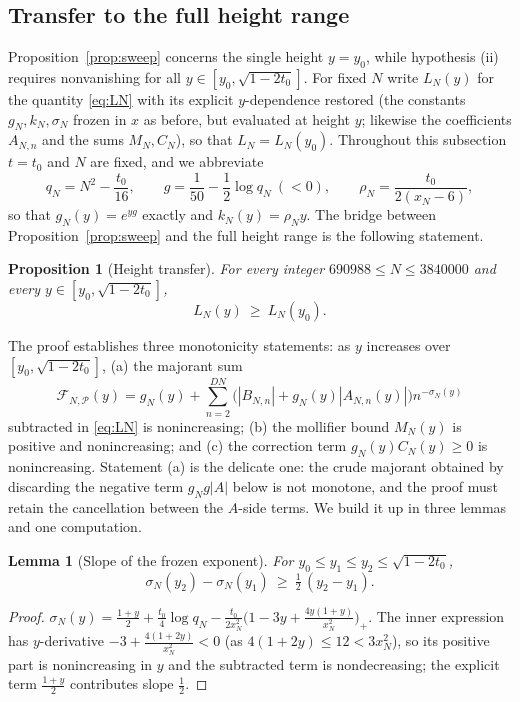 \documentclass[11pt]{article}
\newtheorem{lemma}[theorem]{Lemma}
\newtheorem{proposition}[theorem]{Proposition}
\theoremstyle{definition}
\newcommand{\calP}{\mathcal{P}}
\begin{document}
\subsection{Transfer to the full height range}\label{sec:dini}

Proposition~\ref{prop:sweep} concerns the single height $y=y_0$,
while hypothesis (ii) requires nonvanishing for all
$y\in[y_0,\sqrt{1-2t_0}]$. For fixed $N$ write $L_N(y)$ for the
quantity \eqref{eq:LN} with its explicit $y$-dependence restored
(the constants $g_N,k_N,\sigma_N$ frozen in $x$ as before, but
evaluated at height $y$; likewise the coefficients $A_{N,n}$ and the
sums $M_N,C_N$), so that $L_N=L_N(y_0)$. Throughout this subsection
$t=t_0$ and $N$ are fixed, and we abbreviate
\[
q_N=N^2-\frac{t_0}{16},
\qquad
g=\frac1{50}-\frac12\log q_N\ (<0),
\qquad
\rho_N=\frac{t_0}{2(x_N-6)},
\]
so that $g_N(y)=e^{yg}$ exactly and $k_N(y)=\rho_Ny$. The bridge
between Proposition~\ref{prop:sweep} and the full height range is
the following statement.

\begin{proposition}[Height transfer]\label{prop:transfer}
For every integer $690988\le N\le3840000$ and every
$y\in[y_0,\sqrt{1-2t_0}]$,
\[
L_N(y)\ \ge\ L_N(y_0).
\]
\end{proposition}

The proof establishes three monotonicity statements: as $y$
increases over $[y_0,\sqrt{1-2t_0}]$, (a) the majorant sum
\[
\mathcal F_{N,\calP}(y)
=g_N(y)+\sum_{n=2}^{DN}
\bigl(|B_{N,n}|+g_N(y)|A_{N,n}(y)|\bigr)n^{-\sigma_N(y)}
\]
subtracted in \eqref{eq:LN} is nonincreasing; (b) the mollifier
bound $M_N(y)$ is positive and nonincreasing; and (c) the correction
term $g_N(y)C_N(y)\ge0$ is nonincreasing. Statement (a) is the
delicate one: the crude
majorant obtained by discarding the negative term $g_N g|A|$ below
is not monotone, and the proof must retain the cancellation between
the $A$-side terms. We build it up in three lemmas and one
computation.

\begin{lemma}[Slope of the frozen exponent]\label{lem:sigmaslope}
For $y_0\le y_1\le y_2\le\sqrt{1-2t_0}$,
\[
\sigma_N(y_2)-\sigma_N(y_1)\ \ge\ \tfrac12\,(y_2-y_1).
\]
\end{lemma}

\begin{proof}
$\sigma_N(y)=\frac{1+y}2+\frac{t_0}4\log q_N
-\frac{t_0}{2x_N^2}\bigl(1-3y+\frac{4y(1+y)}{x_N^2}\bigr)_+$. The
inner expression has $y$-derivative $-3+\frac{4(1+2y)}{x_N^2}<0$
(as $4(1+2y)\le12<3x_N^2$), so its positive part is nonincreasing
in $y$ and the subtracted term is nondecreasing; the explicit term
$\frac{1+y}2$ contributes slope $\frac12$.
\end{proof}
\end{document}
